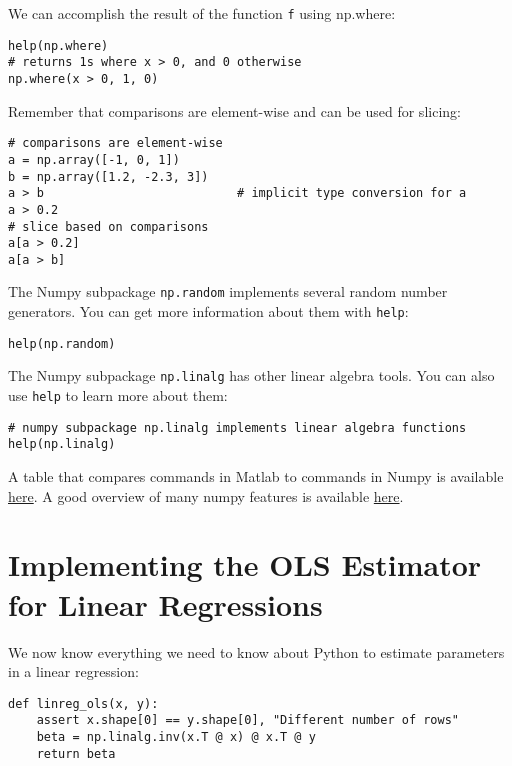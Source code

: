 \documentclass[12pt, a4paper]{article}
\begin{document}
We can accomplish the result of the function \texttt{f} using np.where:
\lstset{language=jupyter-python,label= ,caption= ,captionpos=b,numbers=none}
\begin{lstlisting}
help(np.where)
# returns 1s where x > 0, and 0 otherwise
np.where(x > 0, 1, 0)
\end{lstlisting}

Remember that comparisons are element-wise and can be used for slicing:
\lstset{language=jupyter-python,label= ,caption= ,captionpos=b,numbers=none}
\begin{lstlisting}
# comparisons are element-wise
a = np.array([-1, 0, 1])
b = np.array([1.2, -2.3, 3])
a > b                           # implicit type conversion for a
a > 0.2
# slice based on comparisons
a[a > 0.2]
a[a > b]
\end{lstlisting}

The Numpy subpackage \texttt{np.random} implements several random number generators.
You can get more information about them with \texttt{help}:
\lstset{language=jupyter-python,label= ,caption= ,captionpos=b,numbers=none}
\begin{lstlisting}
help(np.random)
\end{lstlisting}

The Numpy subpackage \texttt{np.linalg} has other linear algebra tools.
You can also use \texttt{help} to learn more about them:
\lstset{language=jupyter-python,label= ,caption= ,captionpos=b,numbers=none}
\begin{lstlisting}
# numpy subpackage np.linalg implements linear algebra functions
help(np.linalg)
\end{lstlisting}

A table that compares commands in Matlab to commands in Numpy is available \href{https://docs.scipy.org/doc/numpy/user/numpy-for-matlab-users.html}{here}.
A good overview of many numpy features is available \href{https://docs.scipy.org/doc/numpy/user/quickstart.html\#quickstart-tutorial}{here}.
\section{Implementing the OLS Estimator for Linear Regressions}
\label{sec:orgada69f0}
We now know everything we need to know about Python to estimate parameters in a linear regression:
\lstset{language=jupyter-python,label= ,caption= ,captionpos=b,numbers=none}
\begin{lstlisting}
def linreg_ols(x, y):
    assert x.shape[0] == y.shape[0], "Different number of rows"
    beta = np.linalg.inv(x.T @ x) @ x.T @ y
    return beta
\end{lstlisting}
\end{document}
